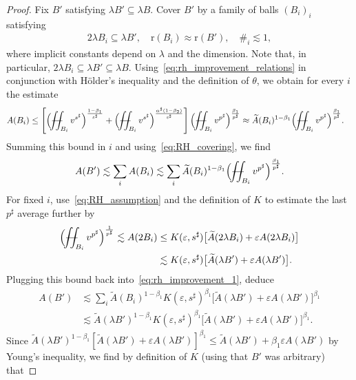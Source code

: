 \documentclass[10pt,a4paper]{amsart}
\def\YYint#1#2#3{{\setbox0=\hbox{$#1{#2#3}{\iint}$}
		\vcenter{\hbox{$#2#3$}}\kern-.51\wd0}}
\def\Yint#1{\mathchoice
	{\YYint\displaystyle\textstyle{#1}}%
	{\YYint\textstyle\scriptstyle{#1}}%
	{\YYint\scriptstyle\scriptscriptstyle{#1}}%
	{\YYint\scriptscriptstyle\scriptscriptstyle{#1}}%
	\!\iint}
\newcommand{\eps}{\varepsilon}
\def\longdash{{-}\mkern-3.5mu{-}}
\renewcommand{\r}{\mathrm{r}}
\def\tiltfiint{\Yint\longdash}
\newcommand{\wt}{\widetilde}
\begin{document}
\begin{proof}
		{Fix $B'$ satisfying $\lambda B' \subseteq \lambda B$.}
		Cover {$B'$} by a family of balls $(B_i)_i$ satisfying%
		\begin{align}
			\label{eq:RH_covering}
			2\lambda B_i \subseteq \lambda B', \quad {\r(B_i) \approx \r(B')}, \quad \#_i \lesssim 1,
		\end{align}
		where implicit constants depend on $\lambda$ and the dimension.
		Note that, in particular, $2\lambda B_i \subseteq \lambda B' \subseteq \lambda B$.
		Using~\eqref{eq:rh_improvement_relations} in conjunction with Hölder's inequality and the definition of $\theta$, we obtain for every $i$ the estimate
		\begin{align}
			A(B_i) &\leq \left[ \Bigl( \tiltfiint_{B_i} v^{s^\sharp} \Bigr)^\frac{1-\beta_1}{s^\sharp} + \Bigl( \tiltfiint_{B_i} v^{s^\sharp} \Bigr)^\frac{\alpha^\sharp (1-\beta_2)}{s^\sharp} \right] \Bigl( \tiltfiint_{B_i} v^{p^\sharp} \Bigr)^\frac{\beta_1}{p^\sharp}
			\approx \wt A(B_i)^{1-\beta_1} \Bigl( \tiltfiint_{B_i} v^{p^\sharp} \Bigr)^\frac{\beta_1}{p^\sharp}.
		\end{align}
		Summing this bound in $i$ and using~\eqref{eq:RH_covering}, we find
		\begin{align}
			\label{eq:rh_improvement_1}
			A({B'}) \lesssim \sum_i A(B_i) \lesssim \sum_i \wt A(B_i)^{{1-\beta_1}} \Bigl( \tiltfiint_{B_i} v^{p^\sharp} \Bigr)^\frac{\beta_1}{p^\sharp}.
		\end{align}
		For fixed $i$, use~\eqref{eq:RH_assumption} and the definition of $K$ to estimate the last $p^\sharp$ average further by
		\begin{align}
			\Bigl( \tiltfiint_{B_i} v^{p^\sharp} \Bigr)^\frac{1}{p^\sharp} \lesssim A(2B_i) &\leq K(\eps, s^\sharp) \bigl[ \wt A(2\lambda B_i) + \eps A(2\lambda B_i) \bigr] \\
			&\lesssim K(\eps, s^\sharp) \bigl[ \wt A(\lambda {B'}) + \eps A(\lambda {B'}) \bigr].
		\end{align}
		Plugging this bound back into~\eqref{eq:rh_improvement_1}, deduce
		\begin{align}
			A({B'}) &\lesssim \sum_i \wt A(B_i)^{1-\beta_1} K(\eps, s^\sharp)^{\beta_1} \bigl[ \wt A(\lambda {B'}) + \eps A(\lambda {B'}) \bigr]^{\beta_1} \\
			&\lesssim \wt A(\lambda {B'})^{1-\beta_1} K(\eps, s^\sharp)^{\beta_1} \bigl[ \wt A(\lambda {B'}) + \eps A(\lambda {B'}) \bigr]^{\beta_1}.
		\end{align}
		Since $\wt A(\lambda {B'})^{1-\beta_1} [ \wt A(\lambda {B'}) + \eps A(\lambda {B'}) ]^{\beta_1} \leq \wt A(\lambda {B'}) + \beta_1 \eps A(\lambda {B'})$ by Young's inequality, we find by definition of $K$ {(using that $B'$ was arbitrary)} that

\end{proof}
\end{document}
